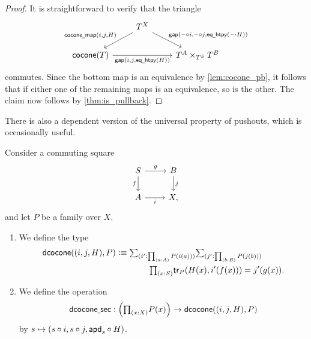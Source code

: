 \begin{proof}
It is straightforward to verify that the triangle
\begin{equation*}
\begin{tikzcd}
& T^X \arrow[dl,swap,"{\mathsf{cocone\usc{}map}(i,j,H)}"] \arrow[dr,"{\mathsf{gap}(\blank\circ i,\blank\circ j, \mathsf{eq\usc{}htpy}(\blank\cdot H))}"] \\
\mathsf{cocone}(T) \arrow[rr,swap,"{\mathsf{gap}(i,j,\mathsf{eq\usc{}htpy}(H))}"] & & T^A \times_{T^S} T^B
\end{tikzcd}
\end{equation*}
commutes. Since the bottom map is an equivalence by \cref{lem:cocone_pb}, it follows that if either one of the remaining maps is an equivalence, so is the other. The claim now follows by \cref{thm:is_pullback}.
\end{proof}

There is also a dependent version of the universal property of pushouts, which is occasionally useful.

\begin{defn}
Consider a commuting square
\begin{equation*}
\begin{tikzcd}
S \arrow[d,swap,"f"] \arrow[r,"g"] & B \arrow[d,"j"] \\
A \arrow[r,swap,"i"] & X,
\end{tikzcd}
\end{equation*}
and let $P$ be a family over $X$. 
\begin{enumerate}
\item We define the type
\begin{align*}
\mathsf{dcocone}((i,j,H),P) & \defeq \sm{i': \prd{a:A}P(i(a))}{j':\prd{b:B}P(j(b))} \\
& \qquad\qquad \prd{x:S} \mathsf{tr}_P(H(x),i'(f(x)))=j'(g(x)).
\end{align*}
\item We define the operation
\begin{equation*}
\mathsf{dcocone\usc{}sec} : \Big(\prd{x:X} P(x)\Big) \to \mathsf{dcocone}((i,j,H),P)
\end{equation*}
by $s\mapsto (s\circ i,s\circ j,\mathsf{apd}_{s}\circ H)$.
\end{enumerate}
\end{defn}

